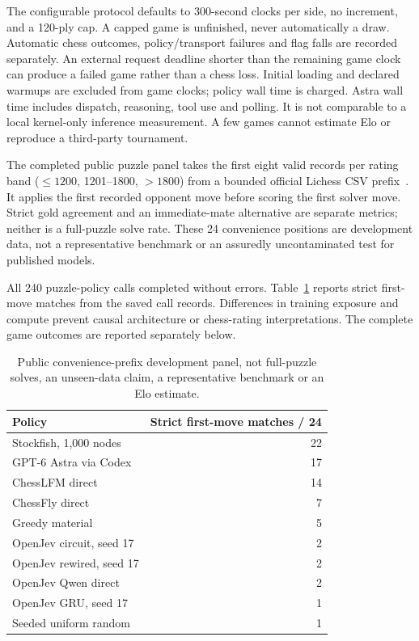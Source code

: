 \documentclass[10pt]{article}
\begin{document}
The configurable protocol defaults to 300-second clocks per side, no increment,
and a 120-ply cap. A capped game is unfinished, never automatically a draw.
Automatic chess outcomes, policy/transport failures and flag falls are recorded
separately. An external request deadline shorter than the remaining game clock
can produce a failed game rather than a chess loss. Initial loading and declared
warmups are excluded from game clocks; policy wall time is charged. Astra wall
time includes dispatch, reasoning, tool use and polling. It is not comparable to
a local kernel-only inference measurement. A few games cannot estimate Elo or
reproduce a third-party tournament.

The completed public puzzle panel takes the first eight valid records per rating
band ($\leq1200$, 1201--1800, $>1800$) from a bounded official Lichess
CSV prefix~\cite{lichess}. It applies the first recorded opponent move before
scoring the first solver move. Strict gold agreement and an immediate-mate
alternative are separate metrics; neither is a full-puzzle solve rate. These
24 convenience positions are development data, not a representative benchmark
or an assuredly uncontaminated test for published models.

All 240 puzzle-policy calls completed without errors. Table~\ref{tab:puzzles}
reports strict first-move matches from the saved call records. Differences in
training exposure and compute prevent causal architecture or chess-rating
interpretations. The complete game outcomes are reported separately below.

\begin{table}[t]
\centering
\begin{tabular}{lr}
\toprule
Policy & Strict first-move matches / 24\\
\midrule
Stockfish, 1,000 nodes & 22\\
GPT-6 Astra via Codex & 17\\
ChessLFM direct & 14\\
ChessFly direct & 7\\
Greedy material & 5\\
OpenJev circuit, seed 17 & 2\\
OpenJev rewired, seed 17 & 2\\
OpenJev Qwen direct & 2\\
OpenJev GRU, seed 17 & 1\\
Seeded uniform random & 1\\
\bottomrule
\end{tabular}
\caption{Public convenience-prefix development panel, not full-puzzle solves,
an unseen-data claim, a representative benchmark or an Elo estimate.}
\label{tab:puzzles}
\end{table}
\end{document}
